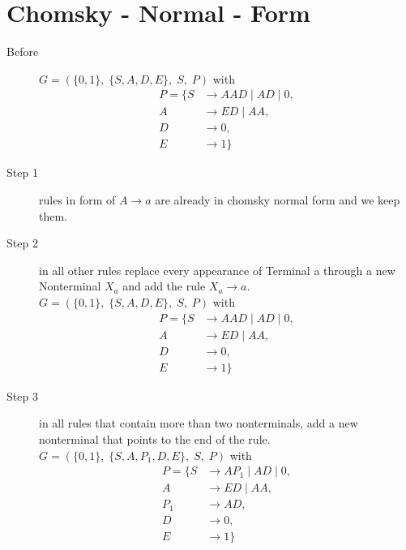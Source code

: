 \documentclass{article}
\begin{document}
\section{Chomsky - Normal - Form}
\begin{description}
	\item[Before]
	$G=\left(\{	0, 1\},\;\{ S, A, D, E\},\;S,\;P\right)$ with
	\begin{align*}
		P=\{	S &\rightarrow AAD\;|\;AD\;|\;0, \\ 
		A &\rightarrow ED\;|\;AA, \\ 
		D &\rightarrow 0, \\ 
		E &\rightarrow 1\}
	\end{align*}
	\item[Step 1] rules in form of $A \rightarrow a$ are already in chomsky normal form and we keep them.
	\item[Step 2] in all other rules replace every appearance of Terminal a through a new Nonterminal $X_a$ and add the rule $X_a \rightarrow a$.
	$G=\left(\{	0, 1\},\;\{ S, A, D, E\},\;S,\;P\right)$ with
	\begin{align*}
		P=\{	S &\rightarrow AAD\;|\;AD\;|\;0, \\ 
		A &\rightarrow ED\;|\;AA, \\ 
		D &\rightarrow 0, \\ 
		E &\rightarrow 1\}
	\end{align*}
	\item[Step 3] in all rules that contain more than two nonterminals, add a new nonterminal that points to the end of the rule.
	$G=\left(\{	0, 1\},\;\{ S, A, P_1, D, E\},\;S,\;P\right)$ with
	\begin{align*}
		P=\{	S &\rightarrow AP_1\;|\;AD\;|\;0, \\ 
		A &\rightarrow ED\;|\;AA, \\ 
		P_1 &\rightarrow AD, \\ 
		D &\rightarrow 0, \\ 
		E &\rightarrow 1\}
	\end{align*}
\end{description}
\end{document}
